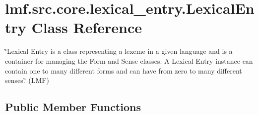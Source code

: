 \hypertarget{classlmf_1_1src_1_1core_1_1lexical__entry_1_1_lexical_entry}{\section{lmf.\+src.\+core.\+lexical\+\_\+entry.\+Lexical\+Entry Class Reference}
\label{classlmf_1_1src_1_1core_1_1lexical__entry_1_1_lexical_entry}
}


\char`\"{}\+Lexical Entry is a class representing a lexeme in a given language and is a container for managing the Form and Sense classes. A Lexical Entry instance can contain one to many different forms and can have from zero to many different senses.\char`\"{} (L\+M\+F)  


\subsection*{Public Member Functions}
